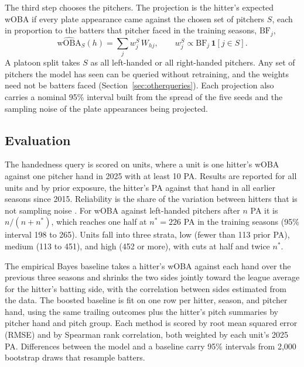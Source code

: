 \documentclass[11pt,letterpaper]{article}
\let\oldsubsection\subsection
\renewcommand\subsection{\FloatBarrier\oldsubsection}
\begin{document}
The third step chooses the pitchers. The projection is the hitter's expected wOBA if every plate appearance came against the chosen set of pitchers $S$, each in proportion to the batters that pitcher faced in the training seasons, $\text{BF}_j$,
\begin{equation}
\widehat{\text{wOBA}}_S(h) = \sum_{j} w^S_j \, W_{hj}, \qquad w^S_j \propto \text{BF}_j \, \mathbf{1}[j \in S].
\label{eq:query}
\end{equation}
A platoon split takes $S$ as all left-handed or all right-handed pitchers. Any set of pitchers the model has seen can be queried without retraining, and the weights need not be batters faced (Section~\ref{sec:otherqueries}). Each projection also carries a nominal 95\% interval built from the spread of the five seeds and the sampling noise of the plate appearances being projected.

\subsection{Evaluation}
\label{sec:eval}

The handedness query is scored on units, where a unit is one hitter's wOBA against one pitcher hand in 2025 with at least 10 PA. Results are reported for all units and by prior exposure, the hitter's PA against that hand in all earlier seasons since 2015. Reliability is the share of the variation between hitters that is not sampling noise \citep{franks2016}. For wOBA against left-handed pitchers after $n$ PA it is $n/(n+n^*)$, which reaches one half at $n^* = 226$ PA in the training seasons (95\% interval 198 to 265). Units fall into three strata, low (fewer than 113 prior PA), medium (113 to 451), and high (452 or more), with cuts at half and twice $n^*$.

The empirical Bayes baseline takes a hitter's wOBA against each hand over the previous three seasons and shrinks the two sides jointly toward the league average for the hitter's batting side, with the correlation between sides estimated from the data. The boosted baseline is fit on one row per hitter, season, and pitcher hand, using the same trailing outcomes plus the hitter's pitch summaries by pitcher hand and pitch group. Each method is scored by root mean squared error (RMSE) and by Spearman rank correlation, both weighted by each unit's 2025 PA. Differences between the model and a baseline carry 95\% intervals from 2,000 bootstrap draws that resample batters.
\end{document}
